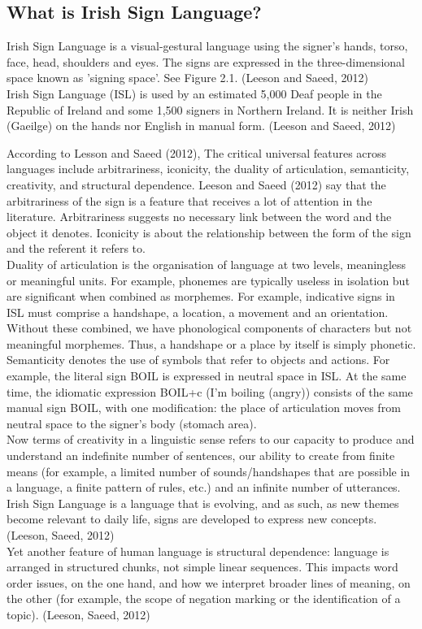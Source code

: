 \subsection{What is Irish Sign Language?}

Irish Sign Language is a visual-gestural language using the signer's hands, torso, face, head, shoulders and eyes. The signs are expressed in the three-dimensional space known as 'signing space'. See Figure 2.1. (Leeson and Saeed, 2012) \\

Irish Sign Language (ISL) is used by an estimated 5,000 Deaf people in the Republic of Ireland and some 1,500 signers in Northern Ireland. It is neither Irish (Gaeilge) on the hands nor English in manual form. (Leeson and Saeed, 2012)

According to Lesson and Saeed (2012), The critical universal features across languages include arbitrariness, iconicity, the duality of articulation, semanticity, creativity, and structural dependence. Leeson and Saeed (2012) say that the arbitrariness of the sign is a feature that receives a lot of attention in the literature. Arbitrariness suggests no necessary link between the word and the object it denotes. Iconicity is about the relationship between the form of the sign and the referent it refers to.
\\
Duality of articulation is the organisation of language at two levels, meaningless or meaningful units. For example, phonemes are typically useless in isolation but are significant when combined as morphemes. For example, indicative signs in ISL must comprise a handshape, a location, a movement and an orientation. Without these combined, we have phonological components of characters but not meaningful morphemes. Thus, a handshape or a place by itself is simply phonetic. Semanticity denotes the use of symbols that refer to objects and actions. For example, the literal sign BOIL is expressed in neutral space in ISL. At the same time, the idiomatic expression BOIL+c (I'm boiling (angry)) consists of the same manual sign BOIL, with one modification: the place of articulation moves from neutral space to the signer's body (stomach area). 
\\
Now terms of creativity in a linguistic sense refers to our capacity to produce and understand an indefinite number of sentences, our ability to create from finite means (for example, a limited number of sounds/handshapes that are possible in a language, a finite pattern of rules, etc.) and an infinite number of utterances. Irish Sign Language is a language that is evolving, and as such, as new themes become relevant to daily life, signs are developed to express new concepts. (Leeson, Saeed, 2012)
\\
Yet another feature of human language is structural dependence: language is arranged in structured chunks, not simple linear sequences. This impacts word order issues, on the one hand, and how we interpret broader lines of meaning, on the other (for example, the scope of negation marking or the identification of a topic). (Leeson, Saeed, 2012)


